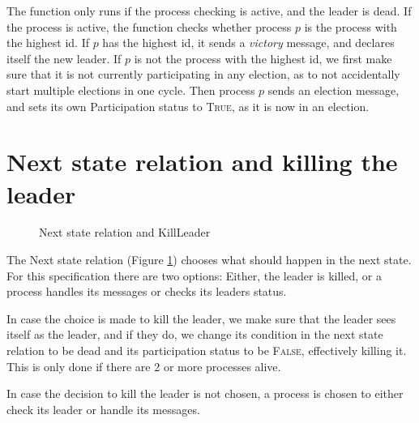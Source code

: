 \documentclass{report}
\begin{document}
The function only runs if the process checking is active, and the leader is dead. If the process is active, the function checks whether process $p$ is the process with the highest id. If $p$ has the highest id, it sends a \textit{victory} message, and declares itself the new leader. If $p$ is not the process with the highest id, we first make sure that it is not currently participating in any election, as to not accidentally start multiple elections in one cycle. Then process $p$ sends an election message, and sets its own Participation status to \textsc{True}, as it is now in an election.


\section{Next state relation and killing the leader}
\begin{figure}

\tlatex
\@x{}\moduleLeftDash{}\moduleRightDash\@xx{}%

%
%
%
\@pvspace{8.0pt}%
%

\fl{}\bottombar\cl{}
\caption{Next state relation and KillLeader}
\label{nextpredkillleader}
\end{figure}

The Next state relation (Figure \ref{nextpredkillleader}) chooses what should happen in the next state.
For this specification there are two options: Either, the leader is killed, or a process handles its messages or checks its leaders status.

In case the choice is made to kill the leader, we make sure that the leader sees itself as the leader, and if they do, we change its condition in the next state relation to be dead and its participation status to be \textsc{False}, effectively killing it. This is only done if there are 2 or more processes alive.

In case the decision to kill the leader is not chosen, a process is chosen to either check its leader or handle its messages.
\end{document}
